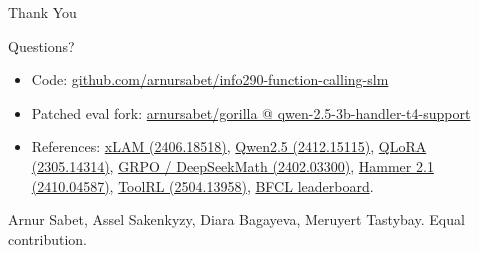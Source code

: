 \documentclass[aspectratio=169,11pt]{beamer}
\begin{document}
\begin{frame}{Thank You}
  \begin{center}
    \Large Questions?
  \end{center}
  \vspace{6pt}
  \begin{itemize}
    \item Code: \href{https://github.com/arnursabet/info290-function-calling-slm}{github.com/arnursabet/info290-function-calling-slm}
    \item Patched eval fork: \href{https://github.com/arnursabet/gorilla/tree/qwen-2.5-3b-handler-t4-support}{arnursabet/gorilla @ qwen-2.5-3b-handler-t4-support}
    \item References: \href{https://arxiv.org/abs/2406.18518}{xLAM (2406.18518)}, \href{https://arxiv.org/abs/2412.15115}{Qwen2.5 (2412.15115)}, \href{https://arxiv.org/abs/2305.14314}{QLoRA (2305.14314)}, \href{https://arxiv.org/abs/2402.03300}{GRPO / DeepSeekMath (2402.03300)}, \href{https://arxiv.org/abs/2410.04587}{Hammer 2.1 (2410.04587)}, \href{https://arxiv.org/abs/2504.13958}{ToolRL (2504.13958)}, \href{https://gorilla.cs.berkeley.edu/leaderboard.html}{BFCL leaderboard}.
  \end{itemize}
  \vspace{6pt}
  {\small\color{dimgray} Arnur Sabet, Assel Sakenkyzy, Diara Bagayeva, Meruyert Tastybay. Equal contribution.}
\end{frame}
\end{document}
